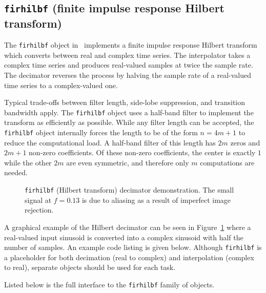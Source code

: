 % 
%
\subsection{{\tt firhilbf} (finite impulse response Hilbert transform)}
\label{module:filter:firhilb}
The {\tt firhilbf} object in \liquid\ implements a finite impulse
response Hilbert transform which
converts between real and complex time series.
The interpolator takes a complex time series and produces real-valued
samples at twice the sample rate.
The decimator reverses the process by halving the sample rate of a
real-valued time series to a complex-valued one.

Typical trade-offs between filter length, side-lobe suppression, and
transition bandwidth apply.
The {\tt firhilbf} object uses a half-band filter to implement the
transform as efficiently as possible.
While any filter length can be accepted, the {\tt firhilbf} object
internally forces the length to be of the form $n=4m+1$
to reduce the computational load.
A half-band filter of this length has $2m$ zeros and $2m+1$ non-zero
coefficients.
Of these non-zero coefficients, the center is exactly $1$ while the other $2m$
are even symmetric, and therefore only $m$ computations are needed.
%
\begin{figure}
\centering
{}
\caption{{\tt firhilbf} (Hilbert transform) decimator demonstration.
         The small signal at $f=0.13$ is due to aliasing as a result of
         imperfect image rejection.}
\label{fig:module:filter:firhilb}
\end{figure}
%
A graphical example of the Hilbert decimator can be seen in
Figure~\ref{fig:module:filter:firhilb}
where a real-valued input sinusoid is converted into a complex sinusoid
with half the number of samples.
%
An example code listing is given below.
Although {\tt firhilbf} is a placeholder for both
decimation (real to complex) and
interpolation (complex to real),
separate objects should be used for each task.
%

%
Listed below is the full interface to the {\tt firhilbf} family of
objects.
%
